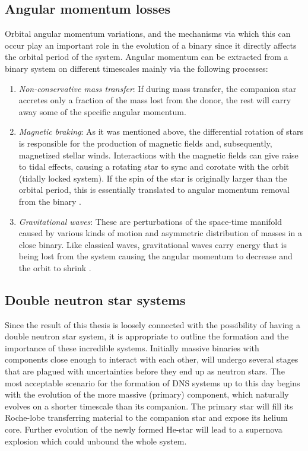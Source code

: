 \documentclass[../../main/thesis_msc.tex]{subfiles}
\begin{document}
			\subsection{Angular momentum losses}
			
				Orbital angular momentum variations, and the mechanisms via which this can occur play an important role in the evolution of a binary since it directly affects the orbital period of the system. Angular momentum can be extracted from a binary system on different timescales \citep{Yakut2008} mainly via the following processes:
				
				\begin{enumerate}[label=(\roman*)]
				
					\item \emph{Non-conservative mass transfer}: If during mass transfer, the companion star accretes only a fraction of the mass lost from the donor, the rest will carry away some of the specific angular momentum.
					\item \emph{Magnetic braking}: As it was mentioned above, the differential rotation of stars is responsible for the production of magnetic fields and, subsequently, magnetized stellar winds. Interactions with the magnetic fields can give raise to tidal effects, causing a rotating star to sync and corotate with the orbit (tidally locked system). If the spin of the star is originally larger than the orbital period, this is essentially translated to angular momentum removal from the binary \citep[see also][]{Rappaport1983}.
					\item \emph{Gravitational waves}:  These are perturbations of the space-time manifold caused by various kinds of motion and asymmetric distribution of masses in a close binary. Like classical waves, gravitational waves carry energy that is being lost from the system causing the angular momentum to decrease and the orbit to shrink \citep[see also][]{Peters1964, Riles2013}.
				
				\end{enumerate}
				
				
			\subsection{Double neutron star systems}
			
				Since the result of this thesis is loosely connected with the possibility of having a double neutron star system, it is appropriate to outline the formation and the importance of these incredible systems. 
				Initially massive binaries with components close enough to interact with each other, will undergo several stages that are plagued with uncertainties before they end up as neutron stars. The most acceptable scenario for the formation of DNS systems up to this day begins with the evolution of the more massive (primary) component, which naturally evolves on a shorter timescale than its companion. The primary star will fill its Roche-lobe transferring material to the companion star and expose its helium core. Further evolution of the newly formed He-star will lead to a supernova explosion which could unbound the whole system. 
				
\end{document}
